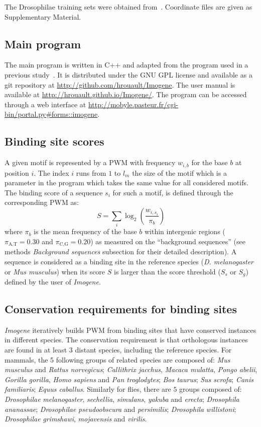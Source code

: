 \documentclass[a4,center,fleqn]{NAR}
\newcommand{\pa}{\pi_\textrm{A,T}}
\newcommand{\pc}{\pi_\textrm{C,G}}
\begin{document}
The Drosophilae training sets were obtained from~\cite{pmid19890324}.
Coordinate files are given as Supplementary Material.



\subsection*{Main program}

The main program is written in C++ and adapted from the program used in
a previous study~\cite{Rouault:2010fk}.
It is distributed under the GNU GPL license and available as a git repository
at \url{http://github.com/hrouault/Imogene}.
The user manual is available at \url{http://hrouault.github.io/Imogene/}.
The program can be accessed through a web
interface at \url{http://mobyle.pasteur.fr/cgi-bin/portal.py#forms::imogene}.

\subsection*{Binding site scores}

A given motif is represented by a PWM with frequency $w_{i,b}$ for the base $b$
at position $i$.
The index $i$ runs from $1$ to $l_m$ the size of the motif which is a parameter
in the program which takes the same value for all considered motifs.
The binding score of a sequence $s_i$ for such a motif, is defined through the
corresponding PWM as:
\begin{equation}
    S=\sum_{i}\log_2\left(\frac{ w_{i,s_i}}{\pi_b}\right)
    \label{score_bs}
\end{equation}
where $\pi_b$ is the mean frequency of  the base $b$ within intergenic regions
( $\pa=0.30$ and $\pc=0.20$) as measured on the ``background sequences'' (see
methods {\em Background sequences } subsection for their detailed description).
A sequence is considered as a binding site in the reference species ({\em D.
melanogaster} or  {\em Mus musculus}) when its score $S$ is larger than the
score threshold ($S_s$ or $S_g$) defined by the user of \textit{Imogene}.

\subsection*{Conservation requirements for binding sites} 
{\em Imogene} iteratively builds PWM from binding sites that have conserved
instances in different species.
The conservation requirement is that orthologous instances are found in at
least 3 distant species, including the reference species.
For mammals, the 5 following groups of related species are composed of: {\em
Mus musculus} and {\em Rattus norvegicus}; {\em Callithrix jacchus}, {\em
Macaca mulatta}, {\em Pongo abelii}, {\em Gorilla gorilla}, {\em Homo sapiens}
and {\em Pan troglodytes};  {\em Bos taurus}; {\em Sus scrofa}; {\em Canis
familiaris}; {\em Equus caballus}.
Similarly for flies, there are $5$ groups composed of:
{\em Drosophilae} {\em melanogaster}, {\em sechellia}, 
{\em simulans}, {\em yakuba} and {\em erecta};
{\em Drosophila} {\em ananassae};
{\em Drosophilae} {\em pseudoobscura} and {\em persimilis};
 {\em Drosophila} {\em willistoni};
 {\em Drosophilae} {\em grimshawi}, {\em mojavensis} and {\em virilis}.
\end{document}

